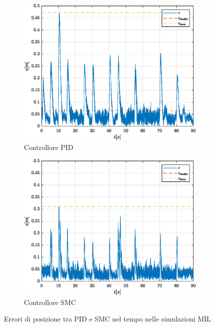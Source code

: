 \begin{figure}
	\centering
	\begin{subfigure}{0.48\textwidth}
		\centering
		\includegraphics[width=1\textwidth]{Simulazioni/Figure/PID/SNAKE_MIL/ERR}
		\caption{Controllore PID}
	\end{subfigure}
	\hfill
	\begin{subfigure}{0.48\textwidth}
		\centering
		\includegraphics[width=1\textwidth]{Simulazioni/Figure/SMC/SNAKE_MIL/ERR}
		\caption{Controllore SMC}
	\end{subfigure}
	\caption{Errori di posizione tra PID e SMC nel tempo nelle simulazioni MIL}
	\label{fig:erroriMIL}
\end{figure}

